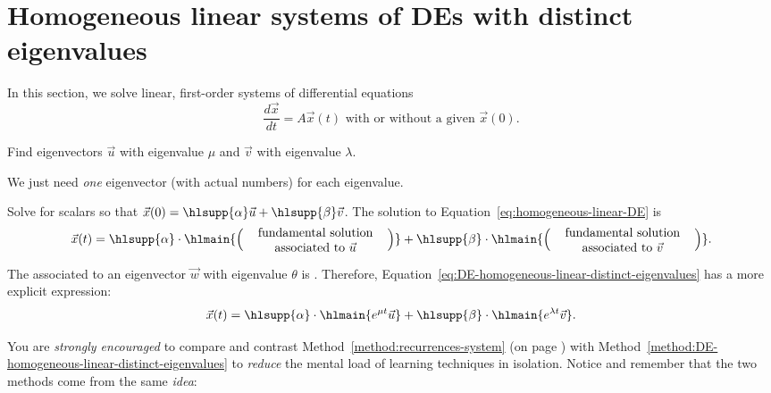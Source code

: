 \documentclass[../main.tex]{subfiles}
\begin{document}
 \section{Homogeneous linear systems of DEs with distinct eigenvalues}
  
In this section, we solve linear, first-order systems of differential equations 
\begin{equation} \label{eq:homogeneous-linear-DE}
  \frac{d\vec{x}}{dt} = A \vec{x}(t) \text{ with or without a given } \vec{x}(0).
\end{equation}

\begin{method} \label{method:DE-homogeneous-linear-distinct-eigenvalues}
  Find eigenvectors \(\vec{u}\) with eigenvalue \(\mu\) and \(\vec{v}\) with eigenvalue \(\lambda\).

  We just need \emph{one} eigenvector (with actual numbers) for each eigenvalue. 

  Solve for scalars \hlsupp{\(\alpha, \beta\)} so that \(\vec{x}(0) = \hlsupp{\alpha} \vec{u} + \hlsupp{\beta} \vec{v}\). The solution to Equation~\eqref{eq:homogeneous-linear-DE} is
  \begin{equation} \label{eq:DE-homogeneous-linear-distinct-eigenvalues}
    \vec{x}(t) = \hlsupp{\alpha} \cdot \hlmain{\left( \parbox[c]{1.6in}{\centering fundamental solution associated to \(\vec{u}\)} \right) } + \hlsupp{\beta} \cdot \hlmain{\left( \parbox[c]{1.6in}{\centering fundamental solution associated to \(\vec{v}\)} \right)}.
  \end{equation}

  The  associated to an eigenvector \(\vec{w}\) with eigenvalue \(\theta\) is .  Therefore, Equation~\ref{eq:DE-homogeneous-linear-distinct-eigenvalues} has a more explicit expression:
  \[
    \vec{x}(t) = \hlsupp{\alpha} \cdot \hlmain{e^{\mu t} \vec{u}} + \hlsupp{\beta} \cdot \hlmain{e^{\lambda t} \vec{v}}.
  \]
\end{method}

You are \emph{strongly encouraged} to compare and contrast Method~\ref{method:recurrences-system} (on page \pageref{eq:solutions-for-recurrence-systems}) with Method~\ref{method:DE-homogeneous-linear-distinct-eigenvalues} to \emph{reduce} the mental load of learning techniques in isolation. Notice and remember that the two methods come from the same \emph{idea}:  
\end{document}

